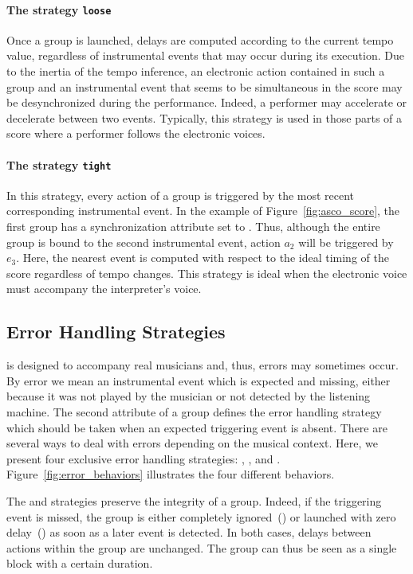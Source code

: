 \documentclass[preprint]{sigplanconf}
\begin{document}
\paragraph{The strategy {\tt loose}}
Once a group is launched, delays are computed according to the current
tempo value, regardless of instrumental events that may occur during
its execution.  Due to the inertia of the tempo inference, an
electronic action contained in such a group and an instrumental event
that seems to be simultaneous in the score may be desynchronized
during the performance.  Indeed, a performer may accelerate or
decelerate between two events. Typically, this strategy is used in
those parts of a score where a performer follows the electronic
voices.

\paragraph{The strategy {\tt tight}}
In this strategy, every action of a group is triggered by the most
recent corresponding instrumental event.  In the example of
Figure~\ref{fig:asco_score}, the first group has a synchronization
attribute set to \tight.  Thus, although the entire group is bound to
the second instrumental event, action $a_2$ will be triggered
by~$e_3$. Here, the nearest event is computed with respect to the
ideal timing of the score regardless of tempo changes. This strategy
is ideal when the electronic voice must accompany the interpreter's
voice.

\subsection{Error Handling Strategies}
\label{sec:ante_error}
\Antescofo is designed to accompany real musicians and, thus, errors
may sometimes occur. By error we mean an instrumental event which is
expected and missing, either because it was not played by the musician
or not detected by the listening machine.  The second attribute of a
group defines the error handling strategy which should be taken when
an expected triggering event is absent.  There are several ways to
deal with errors depending on the musical context. Here, we present
four exclusive error handling strategies: \local, \globl, \partial and
\causal. Figure~\ref{fig:error_behaviors} illustrates the four
different behaviors.

The \local and \globl strategies preserve the integrity of a group.
Indeed, if the triggering event is missed, the group is either
completely ignored~(\local) or launched with zero delay~(\globl) as
soon as a later event is detected. In both cases, delays between
actions within the group are unchanged. The group can thus be seen as
a single block with a certain duration.
\end{document}
